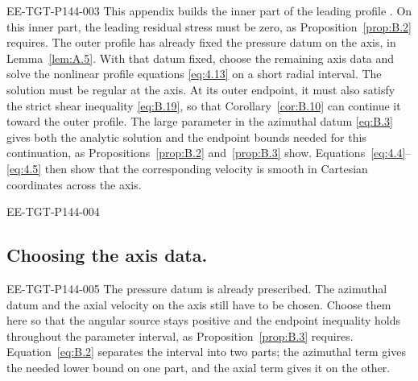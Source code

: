 \begin{EESegment}{EE-TGT-P144-003}
This appendix builds the inner part of the leading profile . On this inner part, the
leading residual stress  must be zero, as Proposition~\ref{prop:B.2} requires. The
outer profile has already fixed the pressure datum  on the axis, in
Lemma~\ref{lem:A.5}. With that datum fixed, choose the remaining axis data
 and solve the nonlinear profile equations \eqref{eq:4.13} on a short radial interval.
The solution must be regular at the axis. At its outer endpoint, it must also satisfy the strict shear inequality
\eqref{eq:B.19}, so that Corollary~\ref{cor:B.10} can continue it toward the outer profile. The large parameter
 in the azimuthal datum \eqref{eq:B.3} gives both the analytic solution and the endpoint
bounds needed for this continuation, as Propositions~\ref{prop:B.2} and~\ref{prop:B.3} show. Equations~\eqref{eq:4.4}--
\eqref{eq:4.5} then show that the corresponding velocity is smooth in Cartesian coordinates across the axis.
\end{EESegment}

\begin{EESegment}{EE-TGT-P144-004}
\subsection{Choosing the axis data.}\label{sec:B.1}
\end{EESegment}
\begin{EESegment}{EE-TGT-P144-005}
The pressure datum  is already prescribed. The azimuthal datum
 and the axial velocity  on the axis still have to
be chosen. Choose them here so that the angular source  stays positive and the endpoint
inequality holds throughout the parameter interval, as Proposition~\ref{prop:B.3} requires. Equation~\eqref{eq:B.2}
separates the interval into two parts; the azimuthal term gives the needed lower bound on one part, and the axial term
gives it on the other.
\end{EESegment}

